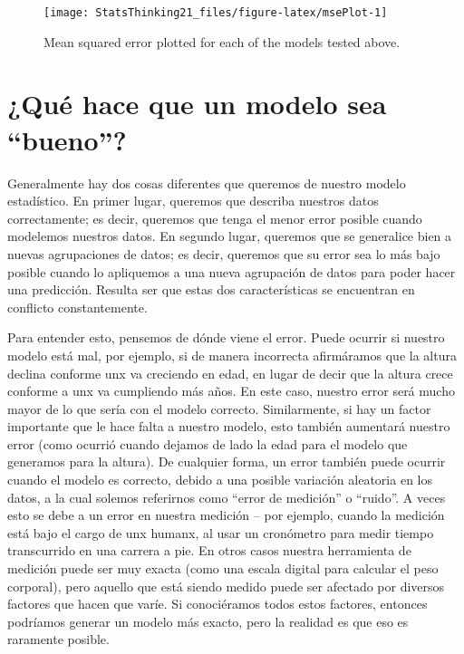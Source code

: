 \documentclass[
  12pt,
]{book}
\begin{document}
\begin{figure}
\texttt{[image: StatsThinking21\_files/figure-latex/msePlot-1]} \caption{Mean squared error plotted for each of the models tested above.}\label{fig:msePlot}
\end{figure}

\hypertarget{quuxe9-hace-que-un-modelo-sea-bueno}{%
\section{¿Qué hace que un modelo sea ``bueno''?}\label{quuxe9-hace-que-un-modelo-sea-bueno}}

Generalmente hay dos cosas diferentes que queremos de nuestro modelo estadístico. En primer lugar, queremos que describa nuestros datos correctamente; es decir, queremos que tenga el menor error posible cuando modelemos nuestros datos. En segundo lugar, queremos que se generalice bien a nuevas agrupaciones de datos; es decir, queremos que su error sea lo más bajo posible cuando lo apliquemos a una nueva agrupación de datos para poder hacer una predicción. Resulta ser que estas dos características se encuentran en conflicto constantemente.

Para entender esto, pensemos de dónde viene el error. Puede ocurrir si nuestro modelo está mal, por ejemplo, si de manera incorrecta afirmáramos que la altura declina conforme unx va creciendo en edad, en lugar de decir que la altura crece conforme a unx va cumpliendo más años. En este caso, nuestro error será mucho mayor de lo que sería con el modelo correcto. Similarmente, si hay un factor importante que le hace falta a nuestro modelo, esto también aumentará nuestro error (como ocurrió cuando dejamos de lado la edad para el modelo que generamos para la altura). De cualquier forma, un error también puede ocurrir cuando el modelo es correcto, debido a una posible variación aleatoria en los datos, a la cual solemos referirnos como ``error de medición'' o ``ruido''. A veces esto se debe a un error en nuestra medición -- por ejemplo, cuando la medición está bajo el cargo de unx humanx, al usar un cronómetro para medir tiempo transcurrido en una carrera a pie. En otros casos nuestra herramienta de medición puede ser muy exacta (como una escala digital para calcular el peso corporal), pero aquello que está siendo medido puede ser afectado por diversos factores que hacen que varíe. Si conociéramos todos estos factores, entonces podríamos generar un modelo más exacto, pero la realidad es que eso es raramente posible.
\end{document}
